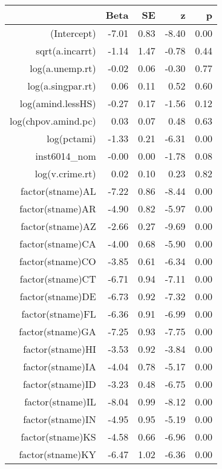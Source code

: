\begin{table}[ht]
\centering
\begin{tabular}{rrrrr}
  \hline
 & Beta & SE & z & p \\ 
  \hline
(Intercept) & -7.01 & 0.83 & -8.40 & 0.00 \\ 
  sqrt(a.incarrt) & -1.14 & 1.47 & -0.78 & 0.44 \\ 
  log(a.unemp.rt) & -0.02 & 0.06 & -0.30 & 0.77 \\ 
  log(a.singpar.rt) & 0.06 & 0.11 & 0.52 & 0.60 \\ 
  log(amind.lessHS) & -0.27 & 0.17 & -1.56 & 0.12 \\ 
  log(chpov.amind.pc) & 0.03 & 0.07 & 0.48 & 0.63 \\ 
  log(pctami) & -1.33 & 0.21 & -6.31 & 0.00 \\ 
  inst6014\_nom & -0.00 & 0.00 & -1.78 & 0.08 \\ 
  log(v.crime.rt) & 0.02 & 0.10 & 0.23 & 0.82 \\ 
  factor(stname)AL & -7.22 & 0.86 & -8.44 & 0.00 \\ 
  factor(stname)AR & -4.90 & 0.82 & -5.97 & 0.00 \\ 
  factor(stname)AZ & -2.66 & 0.27 & -9.69 & 0.00 \\ 
  factor(stname)CA & -4.00 & 0.68 & -5.90 & 0.00 \\ 
  factor(stname)CO & -3.85 & 0.61 & -6.34 & 0.00 \\ 
  factor(stname)CT & -6.71 & 0.94 & -7.11 & 0.00 \\ 
  factor(stname)DE & -6.73 & 0.92 & -7.32 & 0.00 \\ 
  factor(stname)FL & -6.36 & 0.91 & -6.99 & 0.00 \\ 
  factor(stname)GA & -7.25 & 0.93 & -7.75 & 0.00 \\ 
  factor(stname)HI & -3.53 & 0.92 & -3.84 & 0.00 \\ 
  factor(stname)IA & -4.04 & 0.78 & -5.17 & 0.00 \\ 
  factor(stname)ID & -3.23 & 0.48 & -6.75 & 0.00 \\ 
  factor(stname)IL & -8.04 & 0.99 & -8.12 & 0.00 \\ 
  factor(stname)IN & -4.95 & 0.95 & -5.19 & 0.00 \\ 
  factor(stname)KS & -4.58 & 0.66 & -6.96 & 0.00 \\ 
  factor(stname)KY & -6.47 & 1.02 & -6.36 & 0.00 \\ 

\end{tabular}
\end{table}
